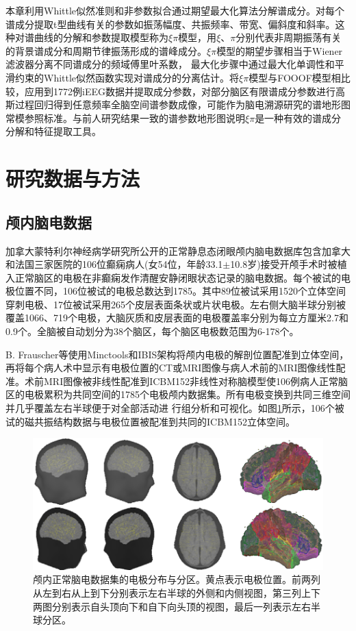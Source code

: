 本章利用Whittle似然准则和非参数拟合通过期望最大化算法分解谱成分。对每个谱成分提取t型曲线有关的参数如振荡幅度、共振频率、带宽、偏斜度和斜率。这种对谱曲线的分解和参数提取模型称为$\xi\pi$模型，用$\xi$、$\pi$分别代表非周期振荡有关的背景谱成分和周期节律振荡形成的谱峰成分。$\xi\pi$模型的期望步骤相当于Wiener滤波器分离不同谱成分的频域傅里叶系数，
最大化步骤中通过最大化单调性和平滑约束的Whittle似然函数实现对谱成分的分离估计。将$\xi\pi$模型与FOOOF模型相比较，应用到1772例iEEG数据并提取成分参数，对部分脑区有限谱成分参数进行高斯过程回归得到任意频率全脑空间谱参数成像，可能作为脑电溯源研究的谱地形图常模参照标准。与前人研究结果一致的谱参数地形图说明$\xi\pi$是一种有效的谱成分分解和特征提取工具。

\section{研究数据与方法}
\subsection{颅内脑电数据}
加拿大蒙特利尔神经病学研究所公开的正常静息态闭眼颅内脑电数据库包含加拿大和法国三家医院的106位癫痫病人(女54位，年龄33.1$\pm$10.8岁)接受开颅手术时被植入正常脑区的电极在非癫痫发作清醒安静闭眼状态记录的脑电数据。每个被试的电极位置不同，106位被试的电极总数达到1785。其中89位被试采用1520个立体空间穿刺电极、17位被试采用265个皮层表面条状或片状电极。左右侧大脑半球分别被覆盖1066、719个电极，大脑灰质和皮层表面的电极覆盖率分别为每立方厘米2.7和0.9个。全脑被自动划分为38个脑区，每个脑区电极数范围为6-178个。

B. Frauscher等使用Minctools和IBIS架构将颅内电极的解剖位置配准到立体空间，再将每个病人术中显示有电极位置的CT或MRI图像与病人术前的MRI图像线性配准。术前MRI图像被非线性配准到ICBM152非线性对称脑模型使106例病人正常脑区的电极累积为共同空间的1785个电极颅内数据集。所有电极变换到共同三维空间并几乎覆盖左右半球便于对全部活动进
行组分析和可视化。如图\ref{7:ele}所示，106个被试的磁共振结构数据与电极位置被配准到共同的ICBM152立体空间。
\begin{figure}[!h]
\includegraphics[width=15cm]{pic/xipi/electrodes.png}
\caption{颅内正常脑电数据集的电极分布与分区。黄点表示电极位置。前两列从左到右从上到下分别表示左右半球的外侧和内侧视图，第三列上下两图分别表示自头顶向下和自下向头顶的视图，最后一列表示左右半球分区。}
\label{7:ele}
\end{figure}

